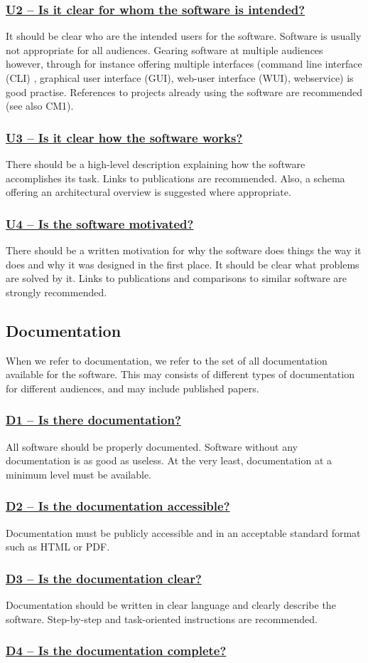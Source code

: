 \documentclass[a4paper,11pt]{article}
\newcommand{\indicator}[1]{\subsubsection*{\underline{#1}}}
\begin{document}
\indicator{U2 -- Is it clear for whom the software is intended?}

It should be clear who are the intended users for the software. Software is
usually not appropriate for all audiences. Gearing software at multiple
audiences however, through for instance offering multiple interfaces (command
line interface (CLI) , graphical user interface (GUI), web-user interface
(WUI), webservice) is good practise. References to projects already using the
software are recommended (see also CM1).

\indicator{U3 -- Is it clear how the software works?}

There should be a high-level description explaining how the software
accomplishes its task. Links to publications are recommended. Also, a schema
offering an architectural overview is suggested where appropriate. 

\indicator{U4 -- Is the software motivated?}

There should be a written motivation for why the software does things the way
it does and why it was designed in the first place. It should be clear what
problems are solved by it. Links to publications and comparisons to similar
software are strongly recommended.

\subsection{Documentation}

When we refer to documentation, we refer to the set of all documentation
available for the software. This may consists of different types of
documentation for different audiences, and may include published papers.

\indicator{D1 -- Is there documentation?}

All software should be properly documented. Software without any documentation
is as good as useless. At the very least, documentation at a minimum level
must be available. 

\indicator{D2 -- Is the documentation accessible?}

Documentation must be publicly accessible and in an acceptable standard format
such as HTML or PDF.

\indicator{D3 -- Is the documentation clear?}

Documentation should be written in clear language and clearly describe the software.
Step-by-step and task-oriented instructions are recommended.

\indicator{D4 -- Is the documentation complete?}
\end{document}
